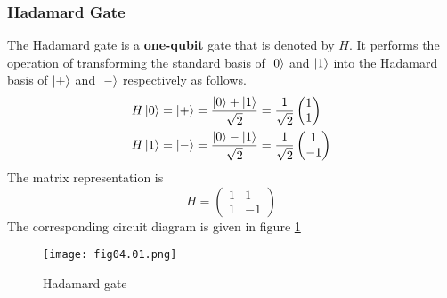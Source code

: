 \subsubsection*{Hadamard Gate}
The Hadamard gate is a \textbf{one-qubit} gate that is denoted by $H$. It performs the operation of transforming the standard basis of $\left\vert 0\right\rangle$ and $\left\vert 1\right\rangle$ into the Hadamard basis of $\left\vert +\right\rangle$ and $\left\vert -\right\rangle$ respectively as follows.
\begin{equation*}
\begin{split}
H\left\vert 0\right\rangle&=\left\vert +\right\rangle=\frac{\displaystyle \left\vert 0\right\rangle+\left\vert 1\right\rangle}{\displaystyle \sqrt{2}}=
\frac{\displaystyle 1}{\displaystyle \sqrt{2}}
\begin{pmatrix}
1\\
1
\end{pmatrix}\\
H\left\vert 1\right\rangle&=\left\vert -\right\rangle=\frac{\displaystyle \left\vert 0\right\rangle-\left\vert 1\right\rangle}{\displaystyle \sqrt{2}}=
\frac{\displaystyle 1}{\displaystyle \sqrt{2}}
\begin{pmatrix}
1\\
-1
\end{pmatrix}\\
\end{split}
\end{equation*}
The matrix representation is
\begin{equation*}
H=
\begin{pmatrix}
1&1\\
1&-1
\end{pmatrix}
\end{equation*}
The corresponding circuit diagram is given in figure \ref{Fig:4.1}
\begin{figure}[!htb]
   \begin{minipage}{\textwidth}
     \centering
     \texttt{[image: fig04.01.png]}
     \caption{Hadamard gate}
     \label{Fig:4.1}
   \end{minipage}
\end{figure}



